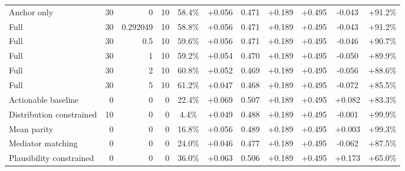 \begin{table}[htbp]
\begin{tabular}{lrrrccccccc}
Anchor only & 30 & 0 & 10 & 58.4\% & +0.056 & 0.471 & +0.189 & +0.495 & -0.043 & +91.2\% \\
Full & 30 & 0.292049 & 10 & 58.8\% & +0.056 & 0.471 & +0.189 & +0.495 & -0.043 & +91.2\% \\
Full & 30 & 0.5 & 10 & 59.6\% & +0.056 & 0.471 & +0.189 & +0.495 & -0.046 & +90.7\% \\
Full & 30 & 1 & 10 & 59.2\% & +0.054 & 0.470 & +0.189 & +0.495 & -0.050 & +89.9\% \\
Full & 30 & 2 & 10 & 60.8\% & +0.052 & 0.469 & +0.189 & +0.495 & -0.056 & +88.6\% \\
Full & 30 & 5 & 10 & 61.2\% & +0.047 & 0.468 & +0.189 & +0.495 & -0.072 & +85.5\% \\
Actionable baseline & 0 & 0 & 0 & 22.4\% & +0.069 & 0.507 & +0.189 & +0.495 & +0.082 & +83.3\% \\
Distribution constrained & 10 & 0 & 0 & 4.4\% & +0.049 & 0.488 & +0.189 & +0.495 & -0.001 & +99.9\% \\
Mean parity & 0 & 0 & 0 & 16.8\% & +0.056 & 0.489 & +0.189 & +0.495 & +0.003 & +99.3\% \\
Mediator matching & 0 & 0 & 0 & 24.0\% & +0.046 & 0.477 & +0.189 & +0.495 & -0.062 & +87.5\% \\
Plausibility constrained & 0 & 0 & 0 & 36.0\% & +0.063 & 0.506 & +0.189 & +0.495 & +0.173 & +65.0\% \\
\bottomrule
\end{tabular}
\end{table}